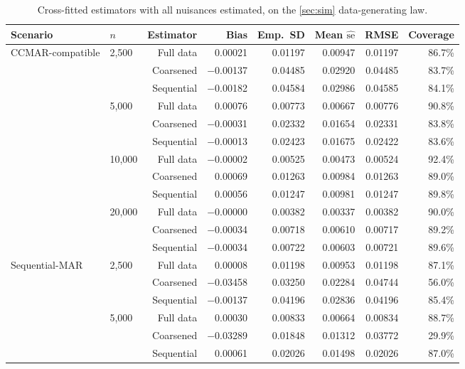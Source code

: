 \begin{table}[ht]
\centering
\begin{threeparttable}
\caption{Cross-fitted estimators with all nuisances estimated, on the
\cref{sec:sim} data-generating law.}
\label{tab:crossfit-size}
\footnotesize
\setlength{\tabcolsep}{4.5pt}
\begin{tabular}{@{}llrrrrrr@{}}
\toprule
Scenario & $n$ & Estimator & Bias & Emp.\ SD & Mean $\widehat{\mathrm{se}}$ & RMSE & Coverage \\
\midrule
CCMAR-compatible & 2,500 & Full data & 0.00021 & 0.01197 & 0.00947 & 0.01197 & 86.7\% \\
 &  & Coarsened & $-$0.00137 & 0.04485 & 0.02920 & 0.04485 & 83.7\% \\
 &  & Sequential & $-$0.00182 & 0.04584 & 0.02986 & 0.04585 & 84.1\% \\
\addlinespace
 & 5,000 & Full data & 0.00076 & 0.00773 & 0.00667 & 0.00776 & 90.8\% \\
 &  & Coarsened & $-$0.00031 & 0.02332 & 0.01654 & 0.02331 & 83.8\% \\
 &  & Sequential & $-$0.00013 & 0.02423 & 0.01675 & 0.02422 & 83.6\% \\
\addlinespace
 & 10,000 & Full data & $-$0.00002 & 0.00525 & 0.00473 & 0.00524 & 92.4\% \\
 &  & Coarsened & 0.00069 & 0.01263 & 0.00984 & 0.01263 & 89.0\% \\
 &  & Sequential & 0.00056 & 0.01247 & 0.00981 & 0.01247 & 89.8\% \\
\addlinespace
 & 20,000 & Full data & $-$0.00000 & 0.00382 & 0.00337 & 0.00382 & 90.0\% \\
 &  & Coarsened & $-$0.00034 & 0.00718 & 0.00610 & 0.00717 & 89.2\% \\
 &  & Sequential & $-$0.00034 & 0.00722 & 0.00603 & 0.00721 & 89.6\% \\
\midrule
Sequential-MAR & 2,500 & Full data & 0.00008 & 0.01198 & 0.00953 & 0.01198 & 87.1\% \\
 &  & Coarsened & $-$0.03458 & 0.03250 & 0.02284 & 0.04744 & 56.0\% \\
 &  & Sequential & $-$0.00137 & 0.04196 & 0.02836 & 0.04196 & 85.4\% \\
\addlinespace
 & 5,000 & Full data & 0.00030 & 0.00833 & 0.00664 & 0.00834 & 88.7\% \\
 &  & Coarsened & $-$0.03289 & 0.01848 & 0.01312 & 0.03772 & 29.9\% \\
 &  & Sequential & 0.00061 & 0.02026 & 0.01498 & 0.02026 & 87.0\% \\

\end{tabular}
\end{threeparttable}
\end{table}
